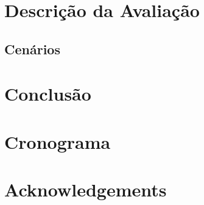 \documentclass[a4paper, 12pt]{article}
\begin{document}
\section{Descrição da Avaliação}


\subsection{Cenários}


\section{Conclusão}



\section{Cronograma}


\section{Acknowledgements}



% 



\end{document}
